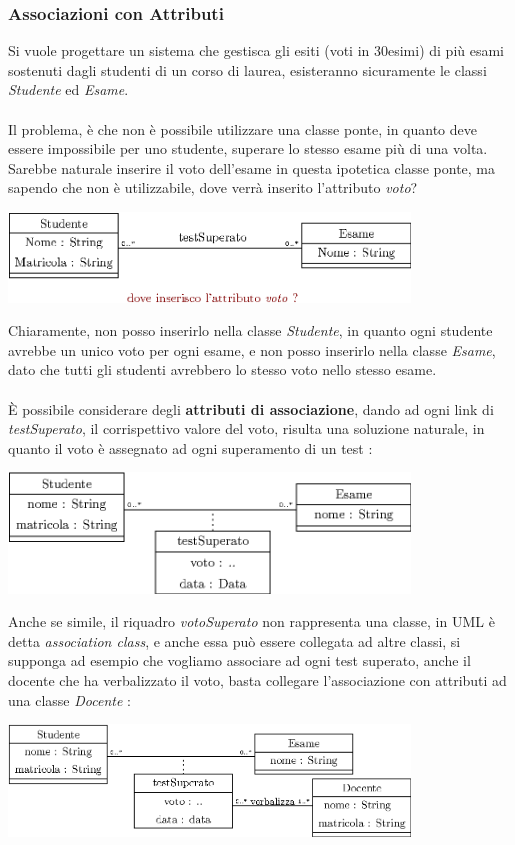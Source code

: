 \documentclass[12pt, letterpaper]{article}
\newcommand{\acc}{\\\hphantom{}\\}
\begin{document}
\subsubsection{Associazioni con Attributi}
Si vuole progettare un sistema che gestisca gli esiti (voti in 30esimi) di 
più esami sostenuti dagli studenti di un corso di laurea, esisteranno sicuramente 
le classi \textit{Studente} ed \textit{Esame}.\acc 
Il problema, è che non è possibile utilizzare una classe ponte, in quanto 
deve essere impossibile per uno studente, superare lo stesso esame più di una volta. Sarebbe 
naturale inserire il voto dell'esame in questa ipotetica classe ponte, ma sapendo che non 
è utilizzabile, dove verrà inserito l'attributo \textit{voto}?
\begin{center}
\includegraphics[width=0.8\textwidth ]{images/votoSbagliato.eps}
\end{center}
 Chiaramente, non posso inserirlo nella classe \textit{Studente}, in quanto 
 ogni studente avrebbe un unico voto per ogni esame, e non posso inserirlo 
 nella classe \textit{Esame}, dato che tutti gli studenti avrebbero lo 
 stesso voto nello stesso esame. \acc 
 È possibile considerare degli \textbf{attributi di associazione}, dando 
 ad ogni link di \textit{testSuperato}, il corrispettivo valore del voto, risulta 
 una soluzione naturale, in quanto il voto è assegnato ad ogni superamento di un test :\begin{center}
    \includegraphics[width=0.8\textwidth ]{images/votoGiusto.eps}
    \end{center} 
Anche se simile, il riquadro \textit{votoSuperato} non rappresenta una 
classe, in UML è detta \textit{association class}, e anche essa può essere collegata ad 
altre classi, si supponga ad esempio che vogliamo associare ad ogni 
test superato, anche il docente che ha verbalizzato il voto, basta 
collegare l'associazione con attributi ad una classe \textit{Docente} : \begin{center}
    \includegraphics[width=0.8\textwidth ]{images/conDocente.eps}
    \end{center} 
\end{document}
